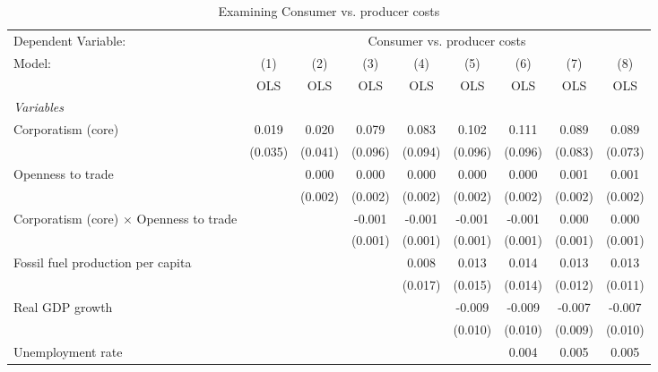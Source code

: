
\begin{table}[htbp]
   \caption{Examining Consumer vs. producer costs}
   \centering
   \begin{tabular}{lcccccccc}
      \toprule
      Dependent Variable: & \multicolumn{8}{c}{Consumer vs. producer costs}\\
      Model:                                         & (1)     & (2)     & (3)     & (4)     & (5)     & (6)     & (7)     & (8)\\  
                                                     &  OLS    & OLS     & OLS     & OLS     & OLS     & OLS     & OLS     & OLS\\  
      \midrule
      \emph{Variables}\\
      Corporatism (core)                             & 0.019   & 0.020   & 0.079   & 0.083   & 0.102   & 0.111   & 0.089   & 0.089\\   
                                                     & (0.035) & (0.041) & (0.096) & (0.094) & (0.096) & (0.096) & (0.083) & (0.073)\\   
      Openness to trade                              &         & 0.000   & 0.000   & 0.000   & 0.000   & 0.000   & 0.001   & 0.001\\   
                                                     &         & (0.002) & (0.002) & (0.002) & (0.002) & (0.002) & (0.002) & (0.002)\\   
      Corporatism (core) $\times$ Openness to trade  &         &         & -0.001  & -0.001  & -0.001  & -0.001  & 0.000   & 0.000\\   
                                                     &         &         & (0.001) & (0.001) & (0.001) & (0.001) & (0.001) & (0.001)\\   
      Fossil fuel production per capita              &         &         &         & 0.008   & 0.013   & 0.014   & 0.013   & 0.013\\   
                                                     &         &         &         & (0.017) & (0.015) & (0.014) & (0.012) & (0.011)\\   
      Real GDP growth                                &         &         &         &         & -0.009  & -0.009  & -0.007  & -0.007\\   
                                                     &         &         &         &         & (0.010) & (0.010) & (0.009) & (0.010)\\   
      Unemployment rate                              &         &         &         &         &         & 0.004   & 0.005   & 0.005\\   

\end{tabular}
\end{table}
